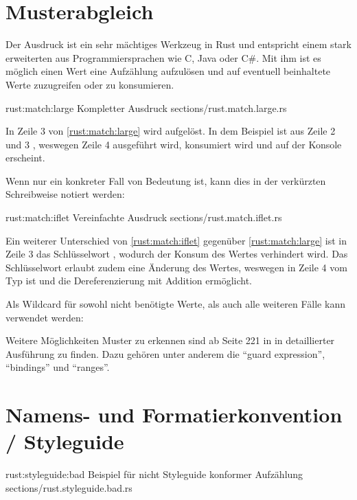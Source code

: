 \section{Musterabgleich}
\label{rust:match}

Der  Ausdruck ist ein sehr mächtiges Werkzeug in Rust und entspricht einem stark erweiterten  aus Programmiersprachen wie C, Java oder C\#.
Mit ihm ist es möglich einen Wert eine Aufzählung aufzulösen und auf eventuell beinhaltete Werte zuzugreifen oder zu konsumieren.

\rustcinclude
	{rust:match:large}
	{Kompletter  Ausdruck}
	{sections/rust.match.large.rs}

In Zeile 3 von \autoref{rust:match:large} wird  aufgelöst.
In dem Beispiel ist  aus Zeile 2 und 3 , weswegen Zeile 4 ausgeführt wird,  konsumiert wird und  auf der Konsole erscheint.

Wenn nur ein konkreter Fall von Bedeutung ist, kann dies in der verkürzten Schreibweise  notiert werden:

\rustcinclude
	{rust:match:iflet}
	{Vereinfachte  Ausdruck}
	{sections/rust.match.iflet.rs}

Ein weiterer Unterschied von \autoref{rust:match:iflet} gegenüber \autoref{rust:match:large} ist in Zeile 3 das Schlüsselwort , wodurch der Konsum des Wertes verhindert wird.
Das Schlüsselwort  erlaubt zudem eine Änderung des Wertes, weswegen  in Zeile 4 vom Typ  ist und die Dereferenzierung mit Addition ermöglicht.

Als Wildcard für sowohl nicht benötigte Werte, als auch alle weiteren Fälle kann \rustcinline{_} verwendet werden: 

Weitere Möglichkeiten Muster zu erkennen sind ab Seite 221 in \cite{rust:orly_programming} in detaillierter Ausführung zu finden.
Dazu gehören unter anderem die \enquote{guard expression}, \enquote{bindings} und \enquote{ranges}.

\section{Namens- und Formatierkonvention / Styleguide}

\rustcinclude
	{rust:styleguide:bad}
	{Beispiel für nicht Styleguide konformer Aufzählung}
	{sections/rust.styleguide.bad.rs}

